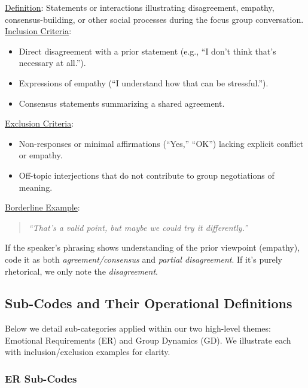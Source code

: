\documentclass[acmsmall]{acmart}
\begin{document}
\begin{description}[leftmargin=1.5em,itemsep=4pt]
\item[\textbf{Group Dynamics (GD)}]
\underline{Definition}: Statements or interactions illustrating disagreement, empathy, consensus-building, or other social processes during the focus group conversation.
\newline
\underline{Inclusion Criteria}:
\begin{itemize}
  \item Direct disagreement with a prior statement (e.g., “I don’t think that’s necessary at all.”).
  \item Expressions of empathy (“I understand how that can be stressful.”).
  \item Consensus statements summarizing a shared agreement.
\end{itemize}
\underline{Exclusion Criteria}:
\begin{itemize}
  \item Non-responses or minimal affirmations (“Yes,” “OK”) lacking explicit conflict or empathy.
  \item Off-topic interjections that do not contribute to group negotiations of meaning.
\end{itemize}
\underline{Borderline Example}:
\begin{quote}
\emph{“That’s a valid point, but maybe we could try it differently.”}
\end{quote}
If the speaker’s phrasing shows understanding of the prior viewpoint (empathy), code it as both \emph{agreement/consensus} and \emph{partial disagreement}. If it’s purely rhetorical, we only note the \emph{disagreement}.

\end{description}

\subsection{Sub-Codes and Their Operational Definitions}

Below we detail sub-categories applied within our two high-level themes: Emotional Requirements (ER) and Group Dynamics (GD). We illustrate each with inclusion/exclusion examples for clarity.

\subsubsection{ER Sub-Codes}
\end{document}
